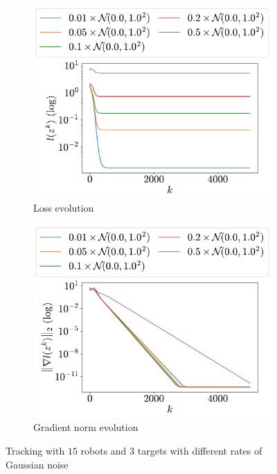 \documentclass[a4paper,11pt,oneside]{book}
\begin{document}
\begin{figure}[H]
      \centering
      \begin{subfigure}[t]{0.48\linewidth}
            \centering
            \includegraphics[width=\linewidth]{./figs/tracking/rates/loss.pdf} 
            \caption{Loss evolution}
      \end{subfigure}
      \hfill
      \begin{subfigure}[t]{0.48\linewidth}
            \centering
            \includegraphics[width=\linewidth]{./figs/tracking/rates/gradient.pdf} 
            \caption{Gradient norm evolution}
      \end{subfigure}
      \caption{Tracking with $15$ robots and $3$ targets with different rates of Gaussian noise}
      \label{fig:tracking_rates_15_3}
\end{figure}
\end{document}
